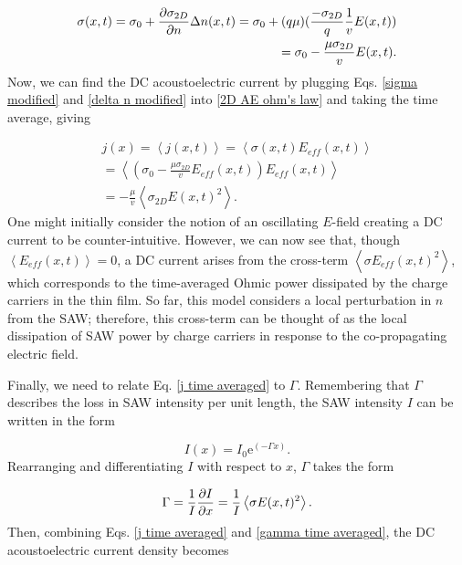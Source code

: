 \documentclass[double,12pt,1in]{beavtex}
\begin{document}
\begin{equation}
    \begin{split}
        \sigma(x,t) = \sigma_0 + \pdv{\sigma_{2D}}{n} \Delta n(x,t) = \sigma_0 + (q \mu)(\frac{-\sigma_{2D}}{q} \frac{1}{v}E(x,t)) \\
        = \sigma_0 - \frac{\mu \sigma_{2D}}{v}E(x,t).
    \end{split}
    \label{sigma modified}
\end{equation}
Now, we can find the DC acoustoelectric current by plugging Eqs. \ref{sigma modified} and \ref{delta n modified} into \ref{2D AE ohm's law} and taking the time average, giving

\begin{equation}
    \begin{split}
        j(x) = \left\langle j(x,t) \right\rangle = \left\langle \sigma(x,t) E_{eff}(x,t) \right\rangle \\
        = \left\langle \left( \sigma_0 - \frac{\mu \sigma_{2D}}{v}E_{eff}(x,t) \right) E_{eff}(x,t)  \right\rangle \\
        = - \frac{\mu}{v}\left\langle\sigma_{2D} E(x,t)^2\right\rangle. 
    \end{split}
    \label{j time averaged}
\end{equation}
One might initially consider the notion of an oscillating $E$-field creating a DC current to be counter-intuitive. However, we can now see that, though $\left\langle E_{eff}(x,t) \right\rangle = 0$, a DC current arises from the cross-term $\left\langle \sigma E_{eff}(x,t) ^2 \right\rangle$, which corresponds to the time-averaged Ohmic power dissipated by the charge carriers in the thin film. So far, this model considers a local perturbation in $n$ from the SAW; therefore, this cross-term can be thought of as the local dissipation of SAW power by charge carriers in response to the co-propagating electric field. 

Finally, we need to relate Eq. \ref{j time averaged} to $\Gamma$. Remembering that $\Gamma$ describes the loss in SAW intensity per unit length, the SAW intensity $I$ can be written in the form

\begin{equation}
    I(x) = I_0 \mathrm{e}^{(-\Gamma x)}.
\end{equation}
Rearranging and differentiating $I$ with respect to $x$, $\Gamma$ takes the form

\begin{equation}
    \Gamma = \frac{1}{I} \pdv{I}{x} = \frac{1}{I}\left\langle\sigma E(x,t)^2\right\rangle. \label{gamma time averaged}
\end{equation}
Then, combining Eqs. \ref{j time averaged} and \ref{gamma time averaged}, the DC acoustoelectric current density becomes
\end{document}
